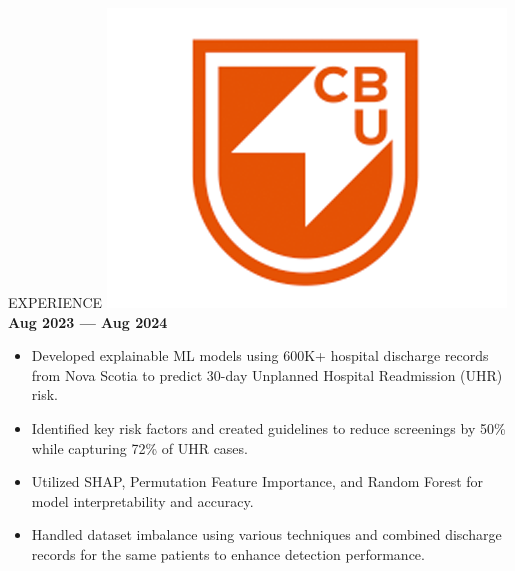 \documentclass{resume}
\begin{document}
\vspace{-0.4cm}
\begin{rSection}{EXPERIENCE}
\includegraphics[height=3\fontcharht\font`\B]{cbu_logo.png}%
 \hfill \textbf{Aug 2023 --- Aug 2024}\vspace{-0.2cm}
\begin{itemize}
    \item Developed explainable ML models using 600K+ hospital discharge records from Nova Scotia to predict 30-day Unplanned Hospital Readmission (UHR) risk. \vspace{-0.2cm}
    \item Identified key risk factors and created guidelines to reduce screenings by 50\% while capturing 72\% of UHR cases.\vspace{-0.2cm}
    \item Utilized SHAP, Permutation Feature Importance, and Random Forest for model interpretability and accuracy.\vspace{-0.2cm}
    \item Handled dataset imbalance using various techniques and combined discharge records for the same patients to
    enhance detection performance.
\end{itemize}




\end{rSection}
\end{document}
